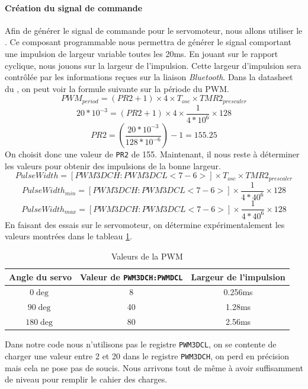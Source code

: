 				\paragraph{Création du signal de commande} Afin de générer le signal de commande pour le servomoteur, nous allons utiliser le \pic. Ce composant programmable nous permettra de générer le signal comportant une impulsion de largeur variable toutes les 20ms. En jouant sur le rapport cyclique, nous jouons sur la largeur de l'impulsion. Cette largeur d'impulsion sera contrôlée par les informations reçues sur la liaison \textit{Bluetooth}. Dans la datasheet du \pic \cite{DatasheetPIC}, on peut voir la formule suivante sur la période du PWM.
				$$ PWM_{period}=(PR2+1)\times 4 \times T_{osc} \times TMR2_{prescaler}$$
				$$ 20*10^{-3}=(PR2+1) \times 4 \times \frac{1}{4*10^{6}} \times 128$$
				$$ PR2=\left(\frac{20*10^{-3}}{128*10^{-6}} \right)-1=155.25$$
				On choisit donc une valeur de \texttt{PR2} de 155. Maintenant, il nous reste à déterminer les valeurs pour obtenir des impulsions de la bonne largeur.
				$$ PulseWidth=[PWM3DCH:PWM3DCL<7-6>]\times T_{osc} \times TMR2_{prescaler}$$
				$$ PulseWidth_{min}=[PWM3DCH:PWM3DCL<7-6>]\times \frac{1}{4*40^{6}} \times 128$$
				$$ PulseWidth_{max}=[PWM3DCH:PWM3DCL<7-6>]\times \frac{1}{4*40^{6}} \times 128$$
				En faisant des essais sur le servomoteur, on détermine expérimentalement les valeurs montrées dans le tableau \ref{PWMval}.
				\begin{table}[h]
				\begin{center}
					\begin{tabular}{c|c|c}
					
					Angle du servo & Valeur de \texttt{PWM3DCH:PWMDCL} & Largeur de l'impulsion \\ 
					\hline 
					$0\deg$ & 8 & 0.256ms \\
					$90\deg$ & 40 & 1.28ms \\
					$180\deg$ & 80 & 2.56ms \\ 
					
					\end{tabular} 
					\caption{Valeurs de la PWM}
					\label{PWMval}
				\end{center}
				\end{table}
				Dans notre code nous n'utilisons pas le registre \texttt{PWM3DCL}, on se contente de charger une valeur entre 2 et 20 dans le registre \texttt{PWM3DCH}, on perd en précision mais cela ne pose pas de soucis. Nous arrivons tout de même à avoir suffisamment de niveau pour remplir le cahier des charges.
